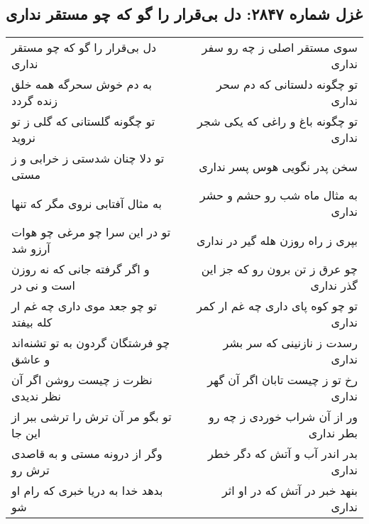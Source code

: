 \begin{center}
\section*{غزل شماره ۲۸۴۷: دل بی‌قرار را گو که چو مستقر نداری}
\label{sec:2847}
\begin{longtable}{l p{0.5cm} r}
دل بی‌قرار را گو که چو مستقر نداری
&&
سوی مستقر اصلی ز چه رو سفر نداری
\\
به دم خوش سحرگه همه خلق زنده گردد
&&
تو چگونه دلستانی که دم سحر نداری
\\
تو چگونه گلستانی که گلی ز تو نروید
&&
تو چگونه باغ و راغی که یکی شجر نداری
\\
تو دلا چنان شدستی ز خرابی و ز مستی
&&
سخن پدر نگویی هوس پسر نداری
\\
به مثال آفتابی نروی مگر که تنها
&&
به مثال ماه شب رو حشم و حشر نداری
\\
تو در این سرا چو مرغی چو هوات آرزو شد
&&
بپری ز راه روزن هله گیر در نداری
\\
و اگر گرفته جانی که نه روزن است و نی در
&&
چو عرق ز تن برون رو که جز این گذر نداری
\\
تو چو جعد موی داری چه غم ار کله بیفتد
&&
تو چو کوه پای داری چه غم ار کمر نداری
\\
چو فرشتگان گردون به تو تشنه‌اند و عاشق
&&
رسدت ز نازنینی که سر بشر نداری
\\
نظرت ز چیست روشن اگر آن نظر ندیدی
&&
رخ تو ز چیست تابان اگر آن گهر نداری
\\
تو بگو مر آن ترش را ترشی ببر از این جا
&&
ور از آن شراب خوردی ز چه رو بطر نداری
\\
وگر از درونه مستی و به قاصدی ترش رو
&&
بدر اندر آب و آتش که دگر خطر نداری
\\
بدهد خدا به دریا خبری که رام او شو
&&
بنهد خبر در آتش که در او اثر نداری
\\
\end{longtable}
\end{center}

